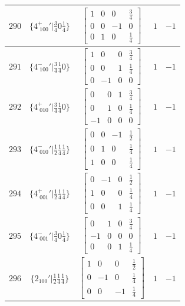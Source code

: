 \documentclass[fleqn,8pt]{jsarticle}
\begin{document}
\begin{longtable}{ccccc}
$ 290 $ & $ \{4^{+}_{\,\,100}{}'|\frac{3}{4} 0 \frac{1}{4}\} $ & $ \begin{bmatrix} 1 & 0 & 0 & \frac{3}{4} \\ 0 & 0 & -1 & 0 \\ 0 & 1 & 0 & \frac{1}{4} \end{bmatrix} $ & $ 1 $ & $ -1 $ \\ \hline
$ 291 $ & $ \{4^{-}_{\,\,100}{}'|\frac{3}{4} \frac{1}{4} 0\} $ & $ \begin{bmatrix} 1 & 0 & 0 & \frac{3}{4} \\ 0 & 0 & 1 & \frac{1}{4} \\ 0 & -1 & 0 & 0 \end{bmatrix} $ & $ 1 $ & $ -1 $ \\ \hline
$ 292 $ & $ \{4^{+}_{\,\,010}{}'|\frac{3}{4} \frac{1}{4} 0\} $ & $ \begin{bmatrix} 0 & 0 & 1 & \frac{3}{4} \\ 0 & 1 & 0 & \frac{1}{4} \\ -1 & 0 & 0 & 0 \end{bmatrix} $ & $ 1 $ & $ -1 $ \\ \hline
$ 293 $ & $ \{4^{-}_{\,\,010}{}'|\frac{1}{2} \frac{1}{4} \frac{1}{4}\} $ & $ \begin{bmatrix} 0 & 0 & -1 & \frac{1}{2} \\ 0 & 1 & 0 & \frac{1}{4} \\ 1 & 0 & 0 & \frac{1}{4} \end{bmatrix} $ & $ 1 $ & $ -1 $ \\ \hline
$ 294 $ & $ \{4^{+}_{\,\,001}{}'|\frac{1}{2} \frac{1}{4} \frac{1}{4}\} $ & $ \begin{bmatrix} 0 & -1 & 0 & \frac{1}{2} \\ 1 & 0 & 0 & \frac{1}{4} \\ 0 & 0 & 1 & \frac{1}{4} \end{bmatrix} $ & $ 1 $ & $ -1 $ \\ \hline
$ 295 $ & $ \{4^{-}_{\,\,001}{}'|\frac{3}{4} 0 \frac{1}{4}\} $ & $ \begin{bmatrix} 0 & 1 & 0 & \frac{3}{4} \\ -1 & 0 & 0 & 0 \\ 0 & 0 & 1 & \frac{1}{4} \end{bmatrix} $ & $ 1 $ & $ -1 $ \\ \hline
$ 296 $ & $ \{2{}_{100}{}'|\frac{1}{2} \frac{1}{4} \frac{1}{4}\} $ & $ \begin{bmatrix} 1 & 0 & 0 & \frac{1}{2} \\ 0 & -1 & 0 & \frac{1}{4} \\ 0 & 0 & -1 & \frac{1}{4} \end{bmatrix} $ & $ 1 $ & $ -1 $ \\ \hline

\end{longtable}
\end{document}
